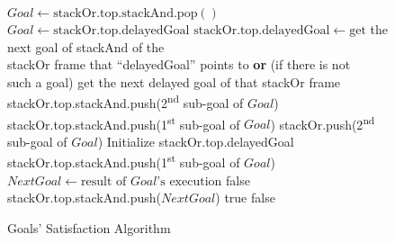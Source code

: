 \documentclass{ws-ijait}
\begin{document}
\begin{figure}
  \centering
  \begin{algorithmic}
          \State $\mathit{Goal} \gets
                  \mathrm{stackOr.top.stackAnd.pop()}$
        \Else
          \State $\mathit{Goal} \gets
                  \mathrm{stackOr.top.delayedGoal}$
          \State $\mathrm{stackOr.top.delayedGoal} \gets
                 \textrm{get}$ the next goal of stackAnd of
                 the \\ \hspace{8em} stackOr frame that
                 ``delayedGoal'' points to \textbf{or} (if
                 there is not \\ \hspace{8em} such a goal)
                 get the next delayed goal of that stackOr
                 frame
        \EndIf
          \State stackOr.top.stackAnd.push(2\textsuperscript{nd}
                 sub-goal of $\mathit{Goal}$)
          \State stackOr.top.stackAnd.push(1\textsuperscript{st}
                 sub-goal of $\mathit{Goal}$)
          \State stackOr.push(2\textsuperscript{nd} sub-goal
                 of $\mathit{Goal}$)
          \State Initialize stackOr.top.delayedGoal
          \State stackOr.top.stackAnd.push(1\textsuperscript{st}
                 sub-goal of $\mathit{Goal}$)
        \Else
          \State $\mathit{NextGoal} \gets \textrm{result
                  of }\mathit{Goal}\textrm{'s execution}$
              \State \Return false
            \EndIf
          \EndIf
            \State stackOr.top.stackAnd.push($\mathit{NextGoal}$)
            \State \Return true 
          \EndIf
        \EndIf
      \EndWhile
      \State \Return false
    \EndFunction
  \end{algorithmic}
  \caption{Goals' Satisfaction Algorithm\label{search}}
\end{figure}
\end{document}
